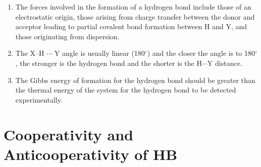 \begin{enumerate}

\item The forces involved in the formation of a hydrogen bond include those of
an electrostatic origin, those arising from charge transfer between the donor
and acceptor leading to partial covalent bond formation between H and Y, and
those originating from dispersion.

\item The X–H $\cdots$ Y angle is usually
linear (180$^{\circ}$) and the closer the angle is to 180$^{\circ}$, the stronger
is the hydrogen bond and the shorter is the $\mathrm{H}\cdots \mathrm{Y}$ distance.

\item The Gibbs energy of formation for the hydrogen bond should be greater
than the thermal energy of the system for the hydrogen bond to be detected
experimentally.

\end{enumerate}
\newpage

\section{Cooperativity and Anticooperativity of HB}


